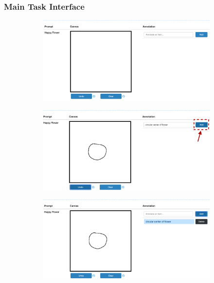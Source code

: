 \subsubsection{Main Task Interface}

\begin{figure}[!htb]
\begin{subfigure}{\textwidth}
    \centering
    \includegraphics[width=.75\linewidth]{data_collection/v1_empty_table.png}  
\end{subfigure}
\newline
\begin{subfigure}{\textwidth}
    \centering
    \includegraphics[width=.75\linewidth]{data_collection/v1_before_enter_text.png}  
\end{subfigure}
\newline
\begin{subfigure}{\textwidth}
    \centering
    \includegraphics[width=.75\linewidth]{data_collection/v1_after_enter_text.png}  

\end{subfigure}
\end{figure}
